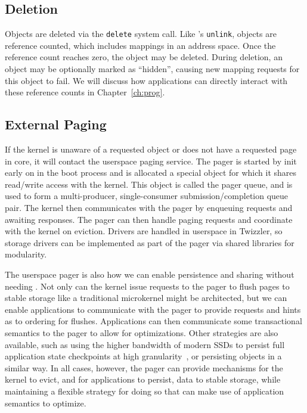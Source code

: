 \subsection{Deletion}

Objects are deleted via the \texttt{delete} system call.
Like \unix's \texttt{unlink}, objects are reference counted, which includes mappings
in an address space. Once the reference count reaches zero, the object may be deleted. During
deletion, an object may be optionally marked as ``hidden'', causing new mapping requests for this
object to fail. We will discuss how applications can directly interact with these reference counts in Chapter~\ref{ch:prog}.

\subsection{External Paging}

If the kernel is unaware of a requested object or does not have a requested page in core, it will contact the userspace
paging service. The pager is started by init early on in the boot process and is allocated a special object for which it
shares read/write access with the kernel. This object is called the pager queue, and is used to form a multi-producer,
single-consumer  submission/completion queue pair. The kernel then communicates with the pager by enqueuing
requests and awaiting responses. The pager can then handle paging requests and coordinate with the kernel on eviction. Drivers are
handled in userspace in Twizzler, so storage drivers can be implemented as part of the pager via shared libraries
for modularity.

The userspace pager is also how we can enable persistence and sharing without needing \NVM. Not only can the kernel
issue requests to the pager to flush pages to stable storage like a traditional microkernel might be architected, but
we can enable applications to communicate with the pager to provide requests and hints as to ordering for flushes.
Applications can then communicate some transactional semantics to the pager to allow for optimizations. Other strategies
are also available, such as using the higher bandwidth of modern SSDs to persist full application state checkpoints at
high granularity~\cite{tsalapatis:sosp21}, or persisting objects in a similar way. In all cases, however, the pager can
provide mechanisms for the kernel to evict, and for applications to persist, data to stable storage, while maintaining a
flexible strategy for doing so that can make use of application semantics to optimize.

